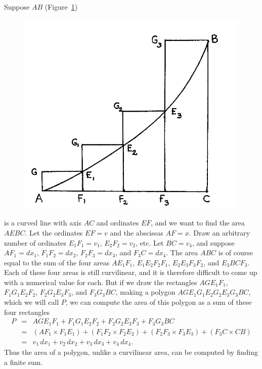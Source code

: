 \documentclass[polutonikogreek,english,twoside,openright]{article}
\newlength{\oldjot}
\begin{document}
\label{meas} Suppose $AB$ (Figure~\ref{areasum})
\begin{figure}[htp]
\begin{center}
\includegraphics[width=.75\textwidth]{fig/Figure35}
\caption{}
\label{areasum}
\vspace{-10pt}
\end{center}
\end{figure} is a curved line with axis $AC$ and ordinates $EF$, and
we want to find the area $AEBC$.  Let the ordinates $EF =v$ and the
abscissas $AF=x$.  Draw an arbitrary number of ordinates $E_1F_1=v_1$,
$E_2F_2=v_2$, etc.  Let $BC=v_4$, and suppose $AF_1=dx_1$,
$F_1F_2 =dx_2$, $F_2F_3= dx_3$, and $F_3C = dx_4$.  The area $ABC$ is
of course equal to the sum of the four areas $AE_1F_1$,
$E_1E_2F_2F_1$, $E_2E_3F_3F_2$, and $E_3BCF_3$.  Each of these four
areas is still curvilinear, and it is therefore difficult to come up
with a numerical value for each. But if we draw the rectangles
$AGE_1F_1$, $F_1G_1E_2F_2$, $F_2G_2E_3F_3$, and $F_3G_3BC$, making a
polygon $AGE_1G_1E_2G_2E_3G_3BC$, which we will call $P$, we can
compute the area of this polygon as a sum of these four rectangles
\setlength{\jot}{1.5ex}
\begin{eqnarray*}
  P & =  & AGE_1F_1 + F_1G_1E_2F_2 + F_2G_2E_3F_3 + F_3G_3BC\\
    & = & (AF_1 \times F_1E_1) + (F_1F_2\times F_2E_2) + (F_2F_3 \times F_3E_3) + (F_3C \times CB)\\
    & = & v_1\,dx_1 + v_2\,dx_2 + v_3\,dx_3 + v_4\,dx_4.
\end{eqnarray*}
\setlength{\jot}{\oldjot}
\hspace{-.35em}Thus the area of a polygon, unlike a curvilinear area,
can be computed by finding a finite sum.
\end{document}
